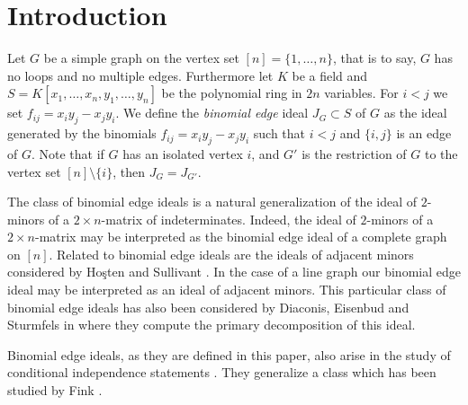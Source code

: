 \documentclass[11pt]{amsart}
\begin{document}
\maketitle
\section*{Introduction}
Let $G$ be a simple graph on the vertex set $[n]=\{1,\ldots,n\}$, that is to say, $G$ has no loops and no multiple
edges. Furthermore let $K$ be a field and $S=K[x_1,\ldots,x_n,y_1,\ldots,y_n]$ be the polynomial ring in $2n$
variables. For $i<j$ we set $f_{ij}=x_iy_j-x_jy_i$. We define the {\em binomial edge} ideal $J_G\subset S$ of $G$ as the
ideal generated by the binomials $f_{ij}=x_iy_j-x_jy_i$ such that $i<j$ and $\{i,j\}$ is an edge of $G$. Note that if
$G$ has an isolated vertex $i$, and $G'$ is the restriction of $G$ to the vertex set $[n]\setminus \{i\}$, then
$J_G=J_{G'}$.

The class of binomial edge ideals is a natural generalization of the ideal of $2$-minors of a $2\times n$-matrix of
indeterminates. Indeed, the ideal of $2$-minors of a $2\times n$-matrix may be interpreted as the binomial edge ideal of
a complete graph on $[n]$. Related to binomial edge ideals are the ideals of adjacent minors considered by Ho\c{s}ten
and Sullivant \cite{HS}. In the case of a line graph our binomial edge ideal may be interpreted as an ideal of adjacent
minors. This particular class of binomial edge ideals has also been considered by Diaconis, Eisenbud and Sturmfels in
\cite{DES} where they compute the primary decomposition of this ideal.

Binomial edge ideals, as they are defined in this paper, also arise in the study of conditional independence statements
\cite{DSS}. They generalize a class which has been studied by Fink \cite{AF}.
\end{document}
